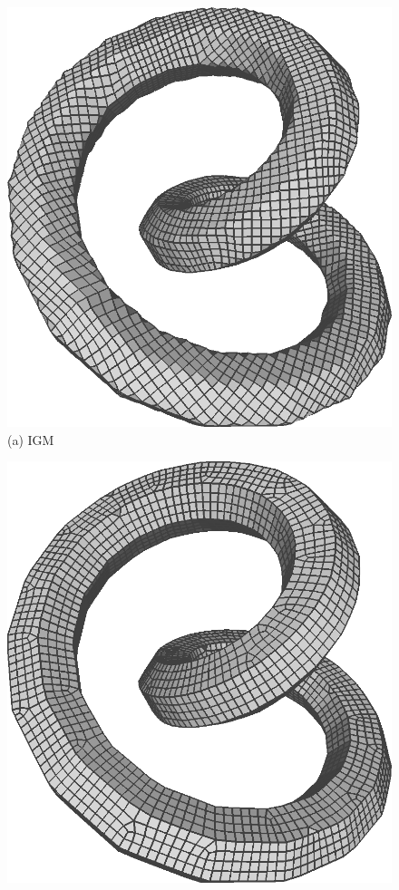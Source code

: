 \begin{figure}
\centering
\begin{minipage}{0.25\linewidth}
\centering
\includegraphics[width=\linewidth]{quadriflow/result/feature01.png}\\
(a) IGM\\
\end{minipage}
\begin{minipage}{0.25\linewidth}
\centering
\includegraphics[width=\linewidth]{quadriflow/result/feature02.png}\\

\end{minipage}
\end{figure}
